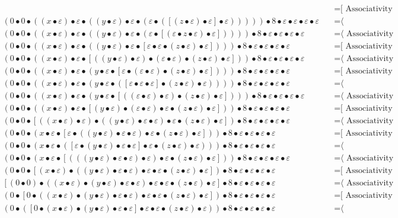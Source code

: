 \documentclass{article}
\begin{document}
\begin{align*}
  & \quad \text{=[ Associativity ⟩}\\
(0 • 0 • ((x • ε) • ε • ((y • ε) • ε • (ε • ([(z • ε) • ε] • ε))))) • 8 • ε • ε • ε • ε
  & \quad \text{=⟨ Commutativity ]}\\
(0 • 0 • ((x • ε) • ε • ((y • ε) • ε • (ε • [(ε • z • ε) • ε])))) • 8 • ε • ε • ε • ε
  & \quad \text{=⟨ Associativity ]}\\
(0 • 0 • ((x • ε) • ε • ((y • ε) • ε • [ε • ε • (z • ε) • ε]))) • 8 • ε • ε • ε • ε
  & \quad \text{=[ Associativity ⟩}\\
(0 • 0 • ((x • ε) • ε • [((y • ε) • ε) • (ε • ε) • (z • ε) • ε])) • 8 • ε • ε • ε • ε
  & \quad \text{=⟨ Associativity ]}\\
(0 • 0 • ((x • ε) • ε • (y • ε • [ε • (ε • ε) • (z • ε) • ε]))) • 8 • ε • ε • ε • ε
  & \quad \text{=[ Associativity ⟩}\\
(0 • 0 • ((x • ε) • ε • (y • ε • ([ε • ε • ε] • (z • ε) • ε)))) • 8 • ε • ε • ε • ε
  & \quad \text{=⟨ Commutativity ]}\\
(0 • 0 • ((x • ε) • ε • (y • ε • [((ε • ε) • ε) • (z • ε) • ε]))) • 8 • ε • ε • ε • ε
  & \quad \text{=⟨ Associativity ]}\\
(0 • 0 • ((x • ε) • ε • [(y • ε) • (ε • ε) • ε • (z • ε) • ε])) • 8 • ε • ε • ε • ε
  & \quad \text{=[ Associativity ⟩}\\
(0 • 0 • [((x • ε) • ε) • ((y • ε) • ε • ε) • ε • (z • ε) • ε]) • 8 • ε • ε • ε • ε
  & \quad \text{=⟨ Associativity ]}\\
(0 • 0 • (x • ε • [ε • ((y • ε) • ε • ε) • ε • (z • ε) • ε])) • 8 • ε • ε • ε • ε
  & \quad \text{=[ Associativity ⟩}\\
(0 • 0 • (x • ε • ([ε • (y • ε) • ε • ε] • ε • (z • ε) • ε))) • 8 • ε • ε • ε • ε
  & \quad \text{=⟨ Commutativity ]}\\
(0 • 0 • (x • ε • [(((y • ε) • ε • ε) • ε) • ε • (z • ε) • ε])) • 8 • ε • ε • ε • ε
  & \quad \text{=⟨ Associativity ]}\\
(0 • 0 • [(x • ε) • ((y • ε) • ε • ε) • ε • ε • (z • ε) • ε]) • 8 • ε • ε • ε • ε
  & \quad \text{=[ Associativity ⟩}\\
[(0 • 0) • ((x • ε) • (y • ε) • ε • ε) • ε • ε • (z • ε) • ε] • 8 • ε • ε • ε • ε
  & \quad \text{=⟨ Associativity ]}\\
(0 • [0 • ((x • ε) • (y • ε) • ε • ε) • ε • ε • (z • ε) • ε]) • 8 • ε • ε • ε • ε
  & \quad \text{=[ Associativity ⟩}\\
(0 • ([0 • (x • ε) • (y • ε) • ε • ε] • ε • ε • (z • ε) • ε)) • 8 • ε • ε • ε • ε
  & \quad \text{=⟨ Commutativity ]}\\

\end{align*}
\end{document}
